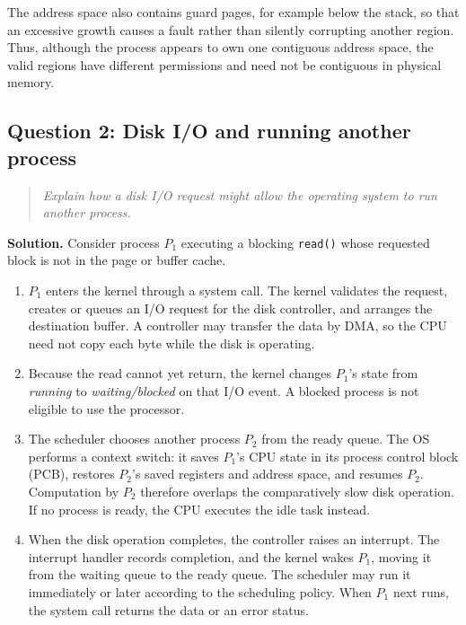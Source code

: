 The address space also contains guard pages, for example below the stack, so
that an excessive growth causes a fault rather than silently corrupting
another region.  Thus, although the process appears to own one contiguous
address space, the valid regions have different permissions and need not be
contiguous in physical memory.

\subsection{Question 2: Disk I/O and running another process}
\begin{quote}
\itshape
Explain how a disk I/O request might allow the operating system to run
another process.
\end{quote}

\textbf{Solution.}
Consider process \(P_1\) executing a blocking \texttt{read()} whose requested
block is not in the page or buffer cache.

\begin{enumerate}
  \item \(P_1\) enters the kernel through a system call.  The kernel validates
  the request, creates or queues an I/O request for the disk controller, and
  arranges the destination buffer.  A controller may transfer the data by
  DMA, so the CPU need not copy each byte while the disk is operating.

  \item Because the read cannot yet return, the kernel changes \(P_1\)'s
  state from \emph{running} to \emph{waiting/blocked} on that I/O event.
  A blocked process is not eligible to use the processor.

  \item The scheduler chooses another process \(P_2\) from the ready queue.
  The OS performs a context switch: it saves \(P_1\)'s CPU state in its
  process control block (PCB), restores \(P_2\)'s saved registers and address
  space, and resumes \(P_2\).  Computation by \(P_2\) therefore overlaps the
  comparatively slow disk operation.  If no process is ready, the CPU
  executes the idle task instead.

  \item When the disk operation completes, the controller raises an
  interrupt.  The interrupt handler records completion, and the kernel wakes
  \(P_1\), moving it from the waiting queue to the ready queue.  The
  scheduler may run it immediately or later according to the scheduling
  policy.  When \(P_1\) next runs, the system call returns the data or an
  error status.
\end{enumerate}

